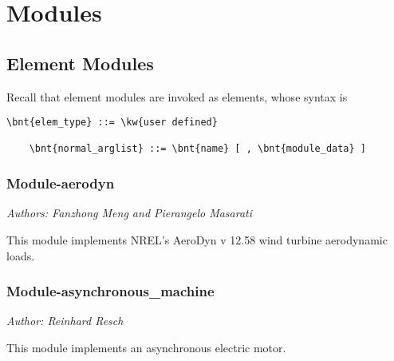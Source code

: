 %
%
%
%
%
% 
%
%

\chapter{Modules}

\section{Element Modules}
Recall that element modules are invoked as  elements,
whose syntax is
\begin{Verbatim}[commandchars=\\\{\}]
    \bnt{elem_type} ::= \kw{user defined}

    \bnt{normal_arglist} ::= \bnt{name} [ , \bnt{module_data} ]
\end{Verbatim}

\subsection{Module-aerodyn}
\emph{Authors: Fanzhong Meng and Pierangelo Masarati}

\noindent
This module implements NREL's AeroDyn v 12.58 wind turbine aerodynamic loads.

\subsection{Module-asynchronous\_machine}
\emph{Author: Reinhard Resch}

\noindent
This module implements an asynchronous electric motor.

